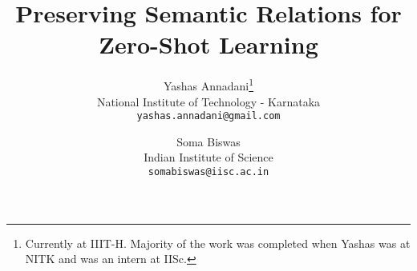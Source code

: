 \documentclass[10pt,twocolumn,letterpaper]{article}
\begin{document}
\title{ Preserving Semantic Relations for Zero-Shot Learning}

\author{Yashas Annadani\thanks{Currently at IIIT-H. Majority of the work was completed when Yashas was at NITK and was an intern at IISc.}\\
	National Institute of Technology - Karnataka\\
	{\tt\small yashas.annadani@gmail.com}
	\and
	Soma Biswas\\
	Indian Institute of Science\\
	{\tt\small somabiswas@iisc.ac.in}
}

\maketitle

\end{document}

